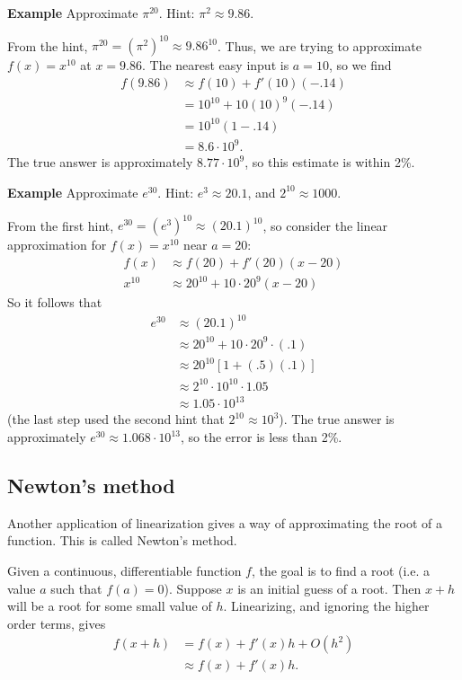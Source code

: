 \documentclass[twoside,openright,titlepage,a4paper]{book}
\begin{document}
\begin{sloppypar}
\textbf{Example} Approximate $\pi^{20}$. Hint: $\pi^2 \approx 9.86$.
\begin{examplebox}
From the hint, $\pi^{20} = (\pi^2)^{10} \approx 9.86^{10}$. Thus, we are trying to approximate $f(x) = x^{10}$ at $x = 9.86$. The nearest easy input is $a = 10$, so we find
\begin{align*}
f(9.86) &\approx f(10) + f'(10)(-.14) \\
&= 10^{10} + 10 (10)^9 (-.14) \\
&= 10^{10} \left(1-.14 \right) \\
&= 8.6 \cdot 10^9.
\end{align*}
The true answer is approximately $8.77 \cdot 10^9$, so this estimate is within 2\%.
\end{examplebox}
	
\textbf{Example} Approximate $e^{30}$. Hint: $e^{3} \approx 20.1$, and $2^{10} \approx 1000$.
\begin{examplebox}
From the first hint, $e^{30} = (e^3)^{10} \approx (20.1)^{10}$, so consider the linear approximation for $f(x) = x^{10}$ near $a=20$:
\begin{align*}
f(x) & \approx f(20) + f'(20)(x-20) \\
x^{10} &\approx 20^{10} + 10 \cdot 20^9 (x-20) 
\end{align*}
So it follows that
\begin{align*} 
e^{30} & \approx (20.1)^{10} \\
& \approx 20^{10} + 10 \cdot 20^9 \cdot (.1) \\
& \approx 20^{10}\left[1+(.5)(.1)\right] \\
& \approx 2^{10} \cdot 10^{10} \cdot 1.05 \\
& \approx 1.05 \cdot 10^{13}
\end{align*}
(the last step used the second hint that $2^{10} \approx 10^3$). The true answer is approximately $e^{30} \approx 1.068 \cdot 10^{13}$, so the error is less than 2\%.	
\end{examplebox}
		
\subsection{Newton's method}
Another application of linearization gives a way of approximating the root of a function. This is called Newton's method.

Given a continuous, differentiable function $f$, the goal is to find a root (i.e. a value $a$ such that $f(a)=0$). Suppose $x$ is an initial guess of a root. Then $x+h$ will be a root for some small value of $h$. Linearizing, and ignoring the higher order terms, gives
\begin{align*}
f(x+h) &= f(x) + f'(x)h + O(h^2) \\
&\approx f(x) + f'(x)h. 
\end{align*}


\end{sloppypar}
\end{document}
